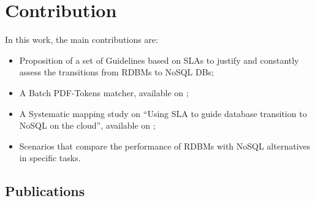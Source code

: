 




\section{Contribution}

In this work, the main contributions are: 

\begin{itemize}
   \item{Proposition of a set of Guidelines based on SLAs to justify and constantly assess the transitions from RDBMs to NoSQL DBs;}
   \item{A Batch PDF-Tokens matcher, available on \cite{pythonBatchPDFTokenMatcher} ;}
   \item{A Systematic mapping study on ``Using SLA to guide database transition to NoSQL on the cloud'', available on \cite{fabioMartinSM};}
   \item{Scenarios that compare the performance of RDBMs with NoSQL alternatives in specific tasks.}
\end{itemize}

\subsection{Publications}

